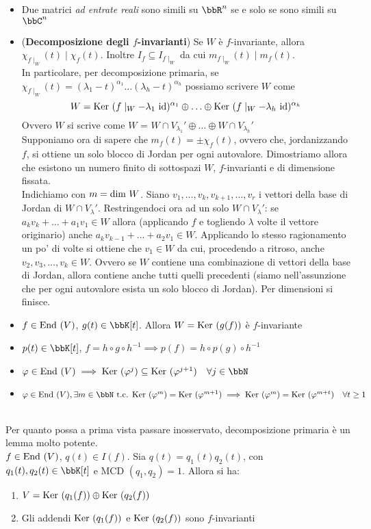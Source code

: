 \documentclass[a4paper,NoNotes,GeneralMath]{stdmdoc}
\begin{document}
\begin{itemize}
		\item Due matrici {\it ad entrate reali} sono simili su $\bbR^n$ se e solo se sono simili su $\bbC^n$
		\item ({\bf Decomposizione degli $f$-invarianti}) Se $W$ è $f$-invariante, allora $\chi_{f\mid_W}(t) \mid \chi_f(t)$. Inoltre $I_f \subseteq I_{f\mid_W}$ da cui $m_{f\mid_W}(t) \mid m_f(t)$. \\ In particolare, per decomposizione primaria, se $\chi_{f\mid_W}(t) = (\lambda_1-t)^{\alpha_1}\ldots(\lambda_h-t)^{\alpha_h}$ possiamo scrivere $W$ come $$W = \Ker (f\mid_W-\lambda_1\ \Id)^{\alpha_1} \oplus \ldots \oplus \Ker (f\mid_W-\lambda_h\ \Id)^{\alpha_h}$$ Ovvero $W$ si scrive come $W$ = $W\cap V_{\lambda_1}' \oplus \ldots \oplus W\cap V_{\lambda_h}'$ \\
		Supponiamo ora di sapere che $m_f(t) = \pm \chi_f(t)$, ovvero che, jordanizzando $f$, si ottiene un solo blocco di Jordan per ogni autovalore. Dimostriamo allora che esistono un numero finito di sottospazi $W$, $f$-invarianti e di dimensione fissata. \\
		Indichiamo con $m = \mbox{dim } W$. Siano $v_1, \ldots, v_k, v_{k+1}, \ldots, v_{r}$ i vettori della base di Jordan di $W \cap V_{\lambda}'$. Restringendoci ora ad un solo $W \cap V_{\lambda}'$: se $a_kv_k+\ldots+a_1v_1 \in W$ allora (applicando $f$ e togliendo $\lambda$ volte il vettore originario) anche $a_kv_{k-1}+\ldots+a_2v_1 \in W$. Applicando lo stesso ragionamento un po' di volte si ottiene che $v_1 \in W$ da cui, procedendo a ritroso, anche $v_2, v_3, \ldots, v_k \in W$. Ovvero se $W$ contiene una combinazione di vettori della base di Jordan, allora contiene anche tutti quelli precedenti (siamo nell'assunzione che per ogni autovalore esista un solo blocco di Jordan). Per dimensioni si finisce.
		\item $f \in \mbox{End }(V)$, $g(t) \in \bbK[t]$. Allora $W = \mbox{Ker }(g(f))$ è $f$-invariante
		\item $p(t) \in \bbK[t]$, $f = h\circ g\circ h^{-1} \implies p(f) = h\circ p(g)\circ h^{-1}$
		\item $\varphi \in \End(V) \implies \Ker(\varphi^j) \subseteq \Ker(\varphi^{j+1}) \quad \forall j \in \bbN$
		\item $\varphi \in \End(V), \exists m \in \bbN \tc \Ker (\varphi^m) = \Ker (\varphi^{m+1}) \implies \Ker(\varphi^m) = \Ker (\varphi^{m+t}) \quad \forall t \ge 1$
	\end{itemize}

	 \\ Per quanto possa a prima vista passare inosservato, decomposizione primaria è un lemma molto potente. \\ $f \in \mbox{End }(V)$, $q(t) \in I(f)$. Sia $q(t) = q_1(t)q_2(t)$, con $q_1(t), q_2(t) \in \bbK[t]$ e $\text{MCD }(q_1, q_2) = 1$. Allora si ha:
	\begin{enumerate}
		\item $V = \mbox{Ker } (q_1(f)) \oplus \mbox{Ker } (q_2(f))$
		\item Gli addendi $\mbox{Ker } (q_1(f))$ e $\mbox{Ker }(q_2(f))$ sono $f$-invarianti
	\end{enumerate}
\end{document}
